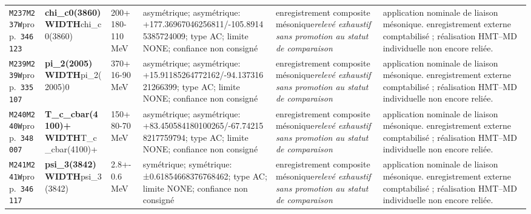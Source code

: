 \begin{landscape}
\begin{longtable}{L{1.85cm}L{4.45cm}L{2.35cm}L{4.05cm}L{3.35cm}L{7.15cm}}
\texttt{M237}\newline \texttt{M237W}\newline prop.\ \texttt{346123} & \textbf{chi\_\allowbreak{}c0(3860) WIDTH}\newline chi\_\allowbreak{}c0(3860) & 200+180-110\,MeV & asymétrique; asymétrique: +177.36967046256811/-105.89145385724009; type AC; limite NONE; confiance non consigné & enregistrement composite mésonique\newline \emph{relevé exhaustif sans promotion au statut de comparaison} & application nominale de liaison mésonique. enregistrement externe comptabilisé ; réalisation HMT--MD individuelle non encore reliée. \\
\texttt{M239}\newline \texttt{M239W}\newline prop.\ \texttt{335107} & \textbf{pi\_\allowbreak{}2(2005) WIDTH}\newline pi\_\allowbreak{}2(2005)0 & 370+16-90\,MeV & asymétrique; asymétrique: +15.91185264772162/-94.13731621266399; type AC; limite NONE; confiance non consigné & enregistrement composite mésonique\newline \emph{relevé exhaustif sans promotion au statut de comparaison} & application nominale de liaison mésonique. enregistrement externe comptabilisé ; réalisation HMT--MD individuelle non encore reliée. \\
\texttt{M240}\newline \texttt{M240W}\newline prop.\ \texttt{348007} & \textbf{T\_\allowbreak{}c\_\allowbreak{}cbar(4100)+ WIDTH}\newline T\_\allowbreak{}c\_\allowbreak{}cbar(4100)+ & 150+80-70\,MeV & asymétrique; asymétrique: +83.450584180100265/-67.742158217759794; type AC; limite NONE; confiance non consigné & enregistrement composite mésonique\newline \emph{relevé exhaustif sans promotion au statut de comparaison} & application nominale de liaison mésonique. enregistrement externe comptabilisé ; réalisation HMT--MD individuelle non encore reliée. \\
\texttt{M241}\newline \texttt{M241W}\newline prop.\ \texttt{346117} & \textbf{psi\_\allowbreak{}3(3842) WIDTH}\newline psi\_\allowbreak{}3(3842) & 2.8+-0.6\,MeV & symétrique; symétrique: ±0.61854668376768462; type AC; limite NONE; confiance non consigné & enregistrement composite mésonique\newline \emph{relevé exhaustif sans promotion au statut de comparaison} & application nominale de liaison mésonique. enregistrement externe comptabilisé ; réalisation HMT--MD individuelle non encore reliée. \\

\end{longtable}
\end{landscape}
